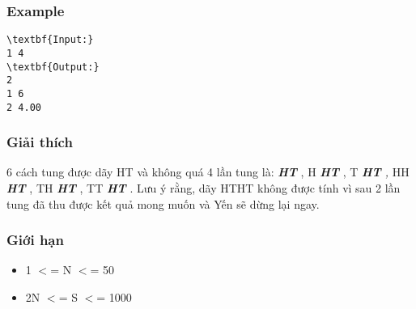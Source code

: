 \subsubsection{Example}
\begin{verbatim}
\textbf{Input:}
1 4
\textbf{Output:}
2
1 6
2 4.00\end{verbatim}

\subsubsection{Giải thích}

6 cách tung được dãy HT và không quá 4 lần tung là: \textbf{\emph{ HT }} , H \textbf{\emph{ HT }} , T \emph{\textbf{ HT } , } HH \textbf{\emph{ HT }} , TH \textbf{\emph{ HT }} , TT \emph{\textbf{ HT }} . Lưu ý rằng, dãy HTHT không được tính vì sau 2 lần tung đã thu được kết quả mong muốn và Yến sẽ dừng lại ngay.

\subsubsection{Giới hạn}
\begin{itemize}
	\item 1 $<$= N $<$= 50
	\item 2N $<$= S $<$= 1000
\end{itemize}

\subsubsection{ }